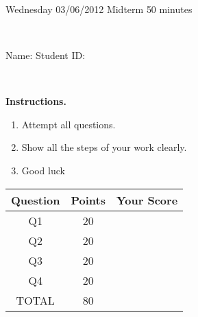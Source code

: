 \documentclass[12pt, oneside]{amsart}
\newcommand{\one}{20}
\newcommand{\two}{20}
\newcommand{\three}{20}
\newcommand{\four}{20}
\begin{document}
%
 
\begin{center}
\hrulefill\\
{\bf \textsf{\raisebox{-0.10cm}{Spring 2013: MATH 240} \hspace{\fill} 
\raisebox{-0.10cm}{Topology} \hspace{\fill}
\raisebox{-0.10cm}{David Karapetyan}}}\\
\hrulefill\\
{\large \rule{0cm}{1.2cm} \textsf{Wednesday 03/06/2012} \hfill
\textsf{Midterm} \hfill  \textsf{50 minutes}}\\
{\large\rule{0cm}{1.2cm}\textsf{Name: \framebox[2.9in]{\rule{0cm}{0.8cm}} 
\hspace{\fill}
Student ID: \framebox[2.1in]{\rule{0cm}{0.8cm}}}}\\
\end{center}
\vspace{0.8cm}

\noindent
{\bf \textsf{Instructions.}}

\begin{enumerate}
\item Attempt all questions.   
\item Show all the steps of your work clearly.  
\item Good luck 
\end{enumerate}

\vfill


\begin{center}
{\large
\begin{tabular}{|c|c|c|}
\hline
\rule[-0.3cm]{0cm}{1cm}
\textsf{Question} & \textsf{Points} &  \textsf{Your Score} \\
\hline
\hline
\rule[-0.3cm]{0cm}{1cm}
\textsf{ Q1} & \one &\\
\hline
\rule[-0.3cm]{0cm}{1cm}
\textsf{ Q2} & \two &\\
\hline
\rule[-0.3cm]{0cm}{1cm}
\textsf{ Q3} & \three &\\
\hline
\rule[-0.3cm]{0cm}{1cm}
\textsf{ Q4} & \four &\\
\hline
\rule[-0.3cm]{0cm}{1cm}

 \textsf{ TOTAL} & 80 & \\
 \hline
 \end{tabular}
} 

\end{center}
\end{document}
